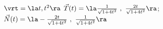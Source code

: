 {$\vrt = \la t, t^2 \ra$
}
{$\vec T(t) = \la \frac{1}{\sqrt{1+4t^2}}\ ,\ \frac{2t}{\sqrt{1+4t^2}}\ra$; $\vec N(t) = \la -\frac{2t}{\sqrt{1+4t^2}}\ ,\ \frac{1}{\sqrt{1+4t^2}}\ra$
}